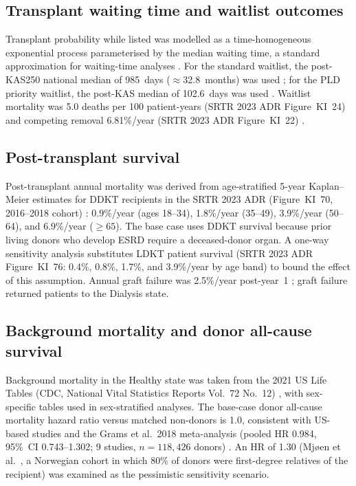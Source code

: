 \subsection{Transplant waiting time and waitlist outcomes}

Transplant probability while listed was modelled as a time-homogeneous
exponential process parameterised by the median waiting time, a standard
approximation for waiting-time analyses \cite{krahn_primer_1997}.
For the standard waitlist, the post-KAS250 national median of 985~days
($\approx$32.8~months) was used \cite{schold_effect_2023};
for the PLD priority waitlist, the post-KAS median of 102.6~days was
used \cite{wainright_impact_2017}.
Waitlist mortality was 5.0 deaths per 100 patient-years (SRTR 2023 ADR
Figure~KI~24) and competing removal 6.81\%/year (SRTR 2023 ADR
Figure~KI~22) \cite{srtr_2023}.

\subsection{Post-transplant survival}

Post-transplant annual mortality was derived from age-stratified 5-year
Kaplan--Meier estimates for DDKT recipients in the SRTR 2023 ADR
(Figure~KI~70, 2016--2018 cohort) \cite{srtr_2023}:
0.9\%/year (ages 18--34), 1.8\%/year (35--49), 3.9\%/year (50--64),
and 6.9\%/year ($\geq 65$).
The base case uses DDKT survival because prior living donors who develop
ESRD require a deceased-donor organ.
A one-way sensitivity analysis substitutes LDKT patient survival
(SRTR 2023 ADR Figure~KI~76: 0.4\%, 0.8\%, 1.7\%, and 3.9\%/year by
age band) to bound the effect of this assumption.
Annual graft failure was 2.5\%/year post-year~1 \cite{srtr_2023};
graft failure returned patients to the Dialysis state.

\subsection{Background mortality and donor all-cause survival}

Background mortality in the Healthy state was taken from the 2021 US
Life Tables (CDC, National Vital Statistics Reports Vol.~72 No.~12)
\cite{cdc_2023}, with sex-specific tables used in sex-stratified analyses.
The base-case donor all-cause mortality hazard ratio versus matched
non-donors is 1.0, consistent with US-based studies
\cite{muzaale_risk_2014, segev_perioperative_2010} and the Grams et al.\
2018 meta-analysis (pooled HR 0.984, 95\%~CI 0.743--1.302;
9 studies, $n = 118{,}426$ donors) \cite{grams_mid-_2018}.
An HR of 1.30 (Mjøen et al.\ \cite{mjoeen_long-term_2014}, a Norwegian
cohort in which 80\% of donors were first-degree relatives of the
recipient) was examined as the pessimistic sensitivity scenario.

